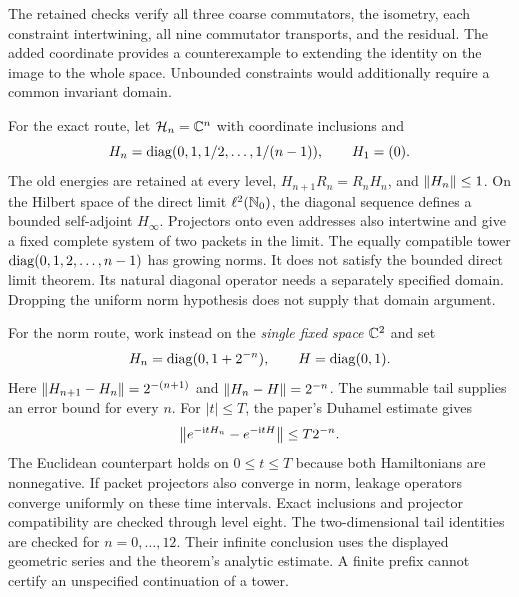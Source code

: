 The retained checks verify all three coarse commutators, the isometry, each constraint intertwining, all nine commutator transports, and the residual. The added coordinate provides a counterexample to extending the identity on the image to the whole space. Unbounded constraints would additionally require a common invariant domain.

For the exact route, let $\mathcal H_n=\mathbb C^n$ with coordinate inclusions and
\[
H_n=\operatorname{diag}(0,1,1/2,\ldots,1/(n-1)),\qquad H_1=(0).
\]
The old energies are retained at every level, $H_{n+1}R_n=R_nH_n$, and $\left\lVert H_n\right\rVert\leq1$. On the Hilbert space of the direct limit $\ell^2(\mathbb N_0)$, the diagonal sequence defines a bounded self-adjoint $H_\infty$. Projectors onto even addresses also intertwine and give a fixed complete system of two packets in the limit.
The equally compatible tower $\operatorname{diag}(0,1,2,\ldots,n-1)$ has growing norms. It does not satisfy the bounded direct limit theorem. Its natural diagonal operator needs a separately specified domain. Dropping the uniform norm hypothesis does not supply that domain argument.

For the norm route, work instead on the \emph{single fixed space} $\mathbb C^2$ and set
\[
H_n=\operatorname{diag}(0,1+2^{-n}),\qquad H=\operatorname{diag}(0,1).
\]
Here $\left\lVert H_{n+1}-H_n\right\rVert=2^{-(n+1)}$ and $\left\lVert H_n-H\right\rVert=2^{-n}$. The summable tail supplies an error bound for every $n$. For $|t|\leq T$, the paper's Duhamel estimate gives
\[
\left\lVert e^{-\mathrm i tH_n}-e^{-\mathrm i tH}\right\rVert\leq T2^{-n}.
\]
The Euclidean counterpart holds on $0\leq t\leq T$ because both Hamiltonians are nonnegative. If packet projectors also converge in norm, leakage operators converge uniformly on these time intervals.
Exact inclusions and projector compatibility are checked through level eight. The two-dimensional tail identities are checked for $n=0,\ldots,12$. Their infinite conclusion uses the displayed geometric series and the theorem's analytic estimate. A finite prefix cannot certify an unspecified continuation of a tower.

